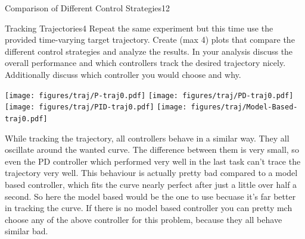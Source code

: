 \begin{questions}
\begin{question}{Comparison of Different Control Strategies}{12}
\begin{answer}
\end{answer}
		
	\end{question}
	
	
	\begin{question}{Tracking Trajectories}{4}
		Repeat the same experiment but this time use the provided time-varying target trajectory. Create (max 4) plots that compare the different control strategies and analyze the results. In your analysis discuss the overall performance and which controllers track the desired trajectory nicely. Additionally discuss which controller you would choose and why.
		
\begin{answer}
	\begin{center}
\texttt{[image: figures/traj/P-traj0.pdf]}
\texttt{[image: figures/traj/PD-traj0.pdf]}\\
\texttt{[image: figures/traj/PID-traj0.pdf]}
\texttt{[image: figures/traj/Model-Based-traj0.pdf]}
	\end{center}

While tracking the trajectory, all controllers behave in a similar way. They all 
oscillate around the wanted curve. The difference between them is very small, so even the PD controller which performed very well in the last task can't trace the trajectory very well. This behaviour is actually pretty bad compared to a model based controller, which fits the curve nearly perfect after just a little over half a second. So here the model based would be the one to use becuase it's far better in tracking the curve. If there is no model based controller you can pretty mch choose any of the above controller for this problem, because they all behave similar bad.
\end{answer}
		

\end{question}
\end{questions}
